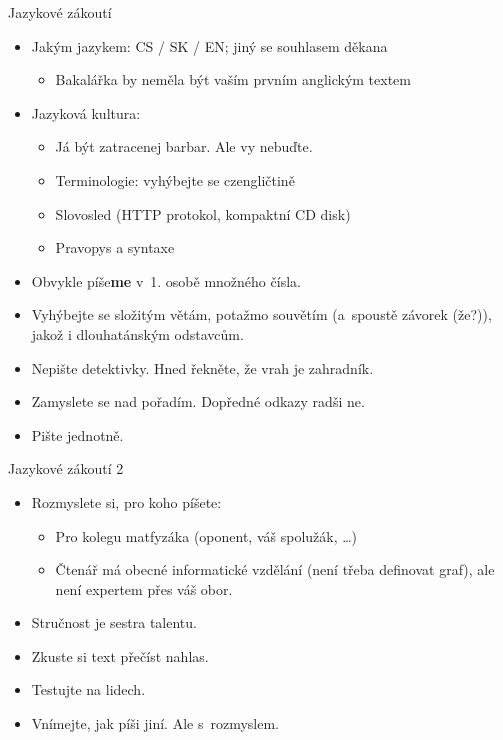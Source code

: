 \documentclass{beamer}
\begin{document}
\begin{frame}{Jazykové zákoutí}

\begin{itemize}
\item Jakým jazykem: CS / SK / EN; jiný se souhlasem děkana
   \begin{itemize}
   \item Bakalářka by neměla být vaším prvním anglickým textem
   \end{itemize}
\item Jazyková kultura:
   \begin{itemize}
   \item Já být zatracenej barbar. Ale vy nebuďte.
   \item Terminologie: vyhýbejte se czengličtině
   \item Slovosled (HTTP protokol, kompaktní CD disk)
   \item Pravopys a syntaxe
   \end{itemize}
\item Obvykle píše{\bf me} v~1. osobě množného čísla.
\item Vyhýbejte se složitým větám, potažmo souvětím (a~spoustě
   závorek (že?)), jakož i dlouhatánským odstavcům.
\item Nepište detektivky. Hned řekněte, že vrah je zahradník.
\item Zamyslete se nad pořadím. Dopředné odkazy radši ne.
\item Pište jednotně.
\end{itemize}

\end{frame}

\begin{frame}{Jazykové zákoutí 2}

\begin{itemize}
\item Rozmyslete si, pro koho píšete:
   \begin{itemize}
   \item Pro kolegu matfyzáka (oponent, váš spolužák, \dots)
   \item Čtenář má obecné informatické vzdělání (není třeba definovat graf),
         ale není expertem přes váš obor.
   \end{itemize}
\item Stručnost je sestra talentu.
\item Zkuste si text přečíst nahlas.
\item Testujte na lidech.
\item Vnímejte, jak píši jiní. Ale s~rozmyslem.
\end{itemize}

\end{frame}
\end{document}

